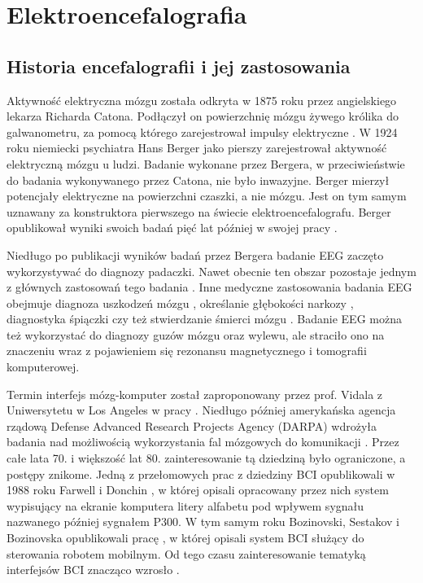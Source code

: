 \documentclass[notitlepage]{report}
\begin{document}
\chapter{Elektroencefalografia}
\section{Historia encefalografii i jej zastosowania}
Aktywność elektryczna mózgu została odkryta w 1875 roku przez angielskiego lekarza Richarda Catona. Podłączył on powierzchnię mózgu żywego królika do galwanometru, za pomocą którego zarejestrował impulsy elektryczne \cite{haas}. W 1924 roku niemiecki psychiatra Hans Berger jako pierszy zarejestrował aktywność elektryczną mózgu u ludzi. Badanie wykonane przez Bergera, w przeciwieństwie do badania wykonywanego przez Catona, nie było inwazyjne. Berger mierzył potencjały elektryczne na powierzchni czaszki, a nie mózgu. Jest on tym samym uznawany za konstruktora pierwszego na świecie elektroencefalografu. Berger opublikował wyniki swoich badań pięć lat później w swojej pracy \cite{berger}.

Niedługo po publikacji wyników badań przez Bergera badanie EEG zaczęto wykorzystywać do diagnozy padaczki. Nawet obecnie ten obszar pozostaje jednym z głównych zastosowań tego badania \cite{smith}. Inne medyczne zastosowania badania EEG obejmuje diagnoza uszkodzeń mózgu \cite{ianof}, określanie głębokości narkozy \cite{simon}, diagnostyka śpiączki \cite{sutter} czy też stwierdzanie śmierci mózgu \cite{webster} \cite{lee}. Badanie EEG można też wykorzystać do diagnozy guzów mózgu oraz wylewu, ale straciło ono na znaczeniu wraz z pojawieniem się rezonansu magnetycznego i tomografii komputerowej.

Termin interfejs mózg-komputer został zaproponowany przez prof. Vidala z Uniwersytetu w Los Angeles w pracy \cite{vidal}. Niedługo później amerykańska agencja rządową Defense Advanced Research Projects Agency (DARPA) wdrożyła badania nad możliwością wykorzystania fal mózgowych do komunikacji \cite{miranda}. Przez całe lata 70. i większość lat 80. zainteresowanie tą dziedziną było ograniczone, a postępy znikome. Jedną z przełomowych prac z dziedziny BCI  opublikowali w 1988 roku Farwell i Donchin \cite{farwell}, w której opisali opracowany przez nich system wypisujący na ekranie komputera litery alfabetu pod wpływem sygnału nazwanego później sygnałem P300. W tym samym roku Bozinovski, Sestakov i Bozinovska opublikowali pracę \cite{bozinovski}, w której opisali system BCI służący do sterowania robotem mobilnym. Od tego czasu zainteresowanie tematyką interfejsów BCI znacząco wzrosło \cite{lebedev} \cite{kubler} \cite{lotte3}.
\end{document}
